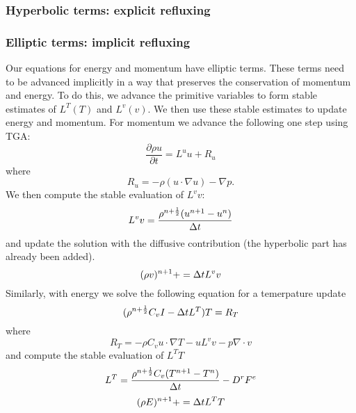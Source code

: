 \subsubsection{Hyperbolic terms: explicit refluxing}

\subsubsection{Elliptic terms: implicit refluxing}
Our equations for energy and momentum have elliptic terms.   These
terms need to be advanced implicitly in a way that preserves the
conservation of momentum and energy.   To do this, we advance the
primitive variables to form stable estimates of $L^T(T)$ and $L^v(v)$.
We then use these stable estimates to update energy and momentum.
For momentum we advance the following one step using TGA:
$$
\frac{\partial \rho u}{\partial t} = L^u u + R_u
$$
where 
$$
R_u = -\rho(u \cdot \nabla u) - \nabla p.
$$
We then compute the stable evaluation of $L^v v$:
$$
L^v v = \frac{\rho^{n+\frac{1}{2}}(u^{n+1}-u^n)}{\Delta t}
$$
and update the solution  with the diffusive contribution (the
hyperbolic part has already been added).
$$
(\rho v)^{n+1} += \Delta t L^v v
$$
Similarly, with energy we solve the following equation for a
temerpature update 
$$
(\rho^{n+\frac{1}{2}} C_v I - \Delta t L^{T}) T = R_T
$$
where
$$
R_T  = -\rho C_v u \cdot \nabla T- u L^v v - p \nabla \cdot v 
$$
and compute the stable evaluation of $L^T T$
$$
L^T = \frac{\rho^{n+\frac{1}{2}} C_v(T^{n+1}-T^n)}{\Delta t} - D^r F^e
$$
$$
(\rho E)^{n+1} += \Delta t L^T T
$$
